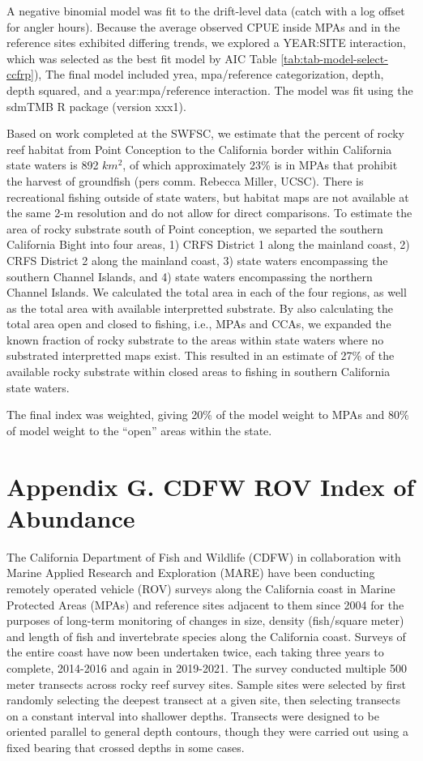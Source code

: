 \documentclass[11pt,
  english,
  letterpaper,
]{article}
\begin{document}
A negative binomial model was fit to the drift-level data (catch with a log offset for angler hours). Because the average observed CPUE inside MPAs and in the reference sites exhibited differing trends, we explored a YEAR:SITE interaction, which was selected as the best fit model by AIC Table \ref{tab:tab-model-select-ccfrp}), The final model included yrea, mpa/reference categorization, depth, depth squared, and a year:mpa/reference interaction. The model was fit using the sdmTMB R package (version xxx1).

Based on work completed at the SWFSC, we estimate that the percent of rocky reef habitat from Point Conception to the California border within California state waters is 892 \(km^2\), of which approximately 23\% is in MPAs that prohibit the harvest of groundfish (pers comm. Rebecca Miller, UCSC). There is recreational fishing outside of state waters, but habitat maps are not available at the same 2-m resolution and do not allow for direct comparisons. To estimate the area of rocky substrate south of Point conception, we separted the southern California Bight into four areas, 1) CRFS District 1 along the mainland coast, 2) CRFS District 2 along the mainland coast, 3) state waters encompassing the southern Channel Islands, and 4) state waters encompassing the northern Channel Islands. We calculated the total area in each of the four regions, as well as the total area with available interpretted substrate. By also calculating the total area open and closed to fishing, i.e., MPAs and CCAs, we expanded the known fraction of rocky substrate to the areas within state waters where no substrated interpretted maps exist. This resulted in an estimate of 27\% of the available rocky substrate within closed areas to fishing in southern California state waters.

The final index was weighted, giving 20\% of the model weight to MPAs and 80\% of model weight to the ``open'' areas within the state.

\hypertarget{cdfw-rov-index}{%
\section{Appendix G. CDFW ROV Index of Abundance}\label{cdfw-rov-index}}

The California Department of Fish and Wildlife (CDFW) in collaboration with Marine Applied Research and Exploration (MARE) have been conducting remotely operated vehicle (ROV) surveys along the California coast in Marine Protected Areas (MPAs) and reference sites adjacent to them since 2004 for the purposes of long-term monitoring of changes in size, density (fish/square meter) and length of fish and invertebrate species along the California coast. Surveys of the entire coast have now been undertaken twice, each taking three years to complete, 2014-2016 and again in 2019-2021. The survey conducted multiple 500 meter transects across rocky reef survey sites. Sample sites were selected by first randomly selecting the deepest transect at a given site, then selecting transects on a constant interval into shallower depths. Transects were designed to be oriented parallel to general depth contours, though they were carried out using a fixed bearing that crossed depths in some cases.
\end{document}
